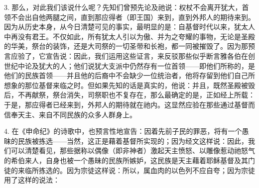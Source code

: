 3. 那么，对此我们该说什么呢？先知们曾预先论及祂说：权杖不会离开犹大，首领不会出自他两腿之间，直到那应得者（即王国）来到，直到外邦人的期待来到。因为从历史本身，从今日清楚可见的事实，最明显的是：自基督时代以来，犹太人中再没有君王。不仅如此，所有犹太人引以为傲、并为之夸耀的事物，无论是圣殿的华美，祭台的装饰，还是大司祭的一切圣带和长袍，都一同被摧毁了。因为那预言应验了，它宣告说：因此，我们运用这些证言，来反驳那些似乎断言雅各伯在创世纪中论及犹大的人；他们说犹大支派中仍然存有一位首领——即他们所称的，是他们的民族首领——并且他的后裔中不会缺少一位统治者，他将存留到他们自己所想象的那位基督来临之时。但如果先知的话是真实的，他说：并且，既然圣殿被毁后，不再献祭，祭台消失，司祭职也不复存在，那么最确定的是，正如经上所载：于是，那应得者已经来到，外邦人的期待就在祂内。这显然应验在那些通过基督而信奉天主、来自不同民族的众多人群身上。\par

4. 在《申命纪》的诗歌中，也预言性地宣告：因着先前子民的罪恶，将有一个愚昧的民族被拣选——当然，这正是藉着基督所实现的；因为经文这样说：因此，我们可以清楚看见，那些据称以偶像（即非神者）激起天主愤怒、以雕像惹动祂怒气的希伯来人，自身也被一个愚昧的民族所嫉妒，这民族是天主藉着耶稣基督及其门徒的来临所拣选的。因为宗徒这样说：所以，属血肉的以色列不应自夸；因为宗徒用了这样的说法：\par

